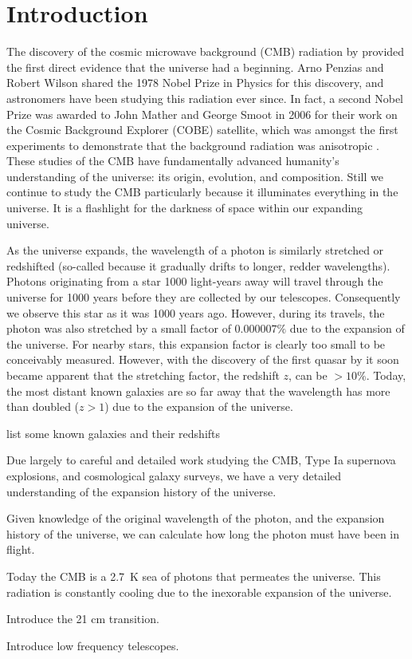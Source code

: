 \chapter{Introduction}

\begin{bibunit}

The discovery of the cosmic microwave background (CMB) radiation by \citet{1965ApJ...142..419P}
provided the first direct evidence that the universe had a beginning. Arno Penzias and Robert Wilson
shared the 1978 Nobel Prize in Physics for this discovery, and astronomers have been studying this
radiation ever since. In fact, a second Nobel Prize was awarded to John Mather and George Smoot in
2006 for their work on the Cosmic Background Explorer (COBE) satellite, which was amongst the first
experiments to demonstrate that the background radiation was anisotropic
\citep{1992ApJ...396L...1S}. These studies of the CMB have fundamentally advanced humanity's
understanding of the universe: its origin, evolution, and composition. Still we continue to study
the CMB particularly because it illuminates everything in the universe. It is a flashlight for the
darkness of space within our expanding universe.

As the universe expands, the wavelength of a photon is similarly stretched or redshifted (so-called
because it gradually drifts to longer, redder wavelengths). Photons originating from a star 1000
light-years away will travel through the universe for 1000 years before they are collected by our
telescopes. Consequently we observe this star as it was 1000 years ago. However, during its travels,
the photon was also stretched by a small factor of $0.000007\%$ due to the expansion of the
universe.  For nearby stars, this expansion factor is clearly too small to be conceivably measured.
However, with the discovery of the first quasar by \citet{1963Natur.197.1040S} it soon became
apparent that the stretching factor, the redshift $z$, can be $>10\%$. Today, the most distant known
galaxies are so far away that the wavelength has more than doubled ($z > 1$) due to the expansion of
the universe.

list some known galaxies and their redshifts

Due largely to careful and detailed work studying the CMB, Type Ia supernova explosions, and
cosmological galaxy surveys, we have a very detailed understanding of the expansion history of the
universe.

Given knowledge of the
original wavelength of the photon, and the expansion history of the universe, we can calculate how
long the photon must have been in flight.


Today the CMB is a 2.7~K sea of photons that permeates the universe. This radiation is constantly
cooling due to the inexorable expansion of the universe.


Introduce the 21 cm transition.

Introduce low frequency telescopes.












\myputbib[thesis]
\end{bibunit}

